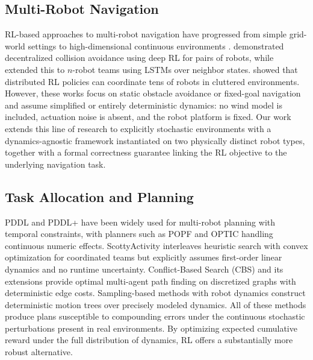\documentclass{article}
\begin{document}
\subsection{Multi-Robot Navigation}
RL-based approaches to multi-robot navigation have progressed from simple grid-world settings to high-dimensional continuous environments \citep{chen2017icra, chen2021iral, everett2018iros, fan2020ijrr}. \citet{chen2017icra} demonstrated decentralized collision avoidance using deep RL for pairs of robots, while \citet{everett2018iros} extended this to $n$-robot teams using LSTMs over neighbor states. \citet{fan2020ijrr} showed that distributed RL policies can coordinate tens of robots in cluttered environments. However, these works focus on static obstacle avoidance or fixed-goal navigation and assume simplified or entirely deterministic dynamics: no wind model is included, actuation noise is absent, and the robot platform is fixed. Our work extends this line of research to explicitly stochastic environments with a dynamics-agnostic framework instantiated on two physically distinct robot types, together with a formal correctness guarantee linking the RL objective to the underlying navigation task.

\subsection{Task Allocation and Planning}
PDDL \citep{fox2003pddl21} and PDDL+ \citep{fox2006pddlplus} have been widely used for multi-robot planning with temporal constraints, with planners such as POPF \citep{coles2010popf} and OPTIC \citep{benton2012optic} handling continuous numeric effects. ScottyActivity \citep{fernandez2018scottyactivity} interleaves heuristic search with convex optimization for coordinated teams but explicitly assumes first-order linear dynamics and no runtime uncertainty. Conflict-Based Search (CBS) \citep{sharon2015cbs} and its extensions \citep{li2019cbscontinuous} provide optimal multi-agent path finding on discretized graphs with deterministic edge costs. Sampling-based methods with robot dynamics \citep{le2017icaps, le2019ral, le2021icra, bui2022iros} construct deterministic motion trees over precisely modeled dynamics. All of these methods produce plans susceptible to compounding errors under the continuous stochastic perturbations present in real environments. By optimizing expected cumulative reward under the full distribution of dynamics, RL offers a substantially more robust alternative.
\end{document}
